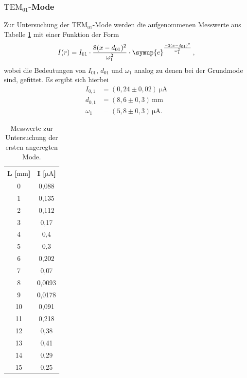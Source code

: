 \subsubsection{$\text{TEM}_{01}$-Mode}
Zur Untersuchung der $\text{TEM}_{01}$-Mode werden die aufgenommenen Messwerte aus Tabelle \ref{mode2} mit einer Funktion der Form
\begin{equation}
  I(r)=I_{01}\cdot\frac{8(x-d_{01})^2}{\omega_1^2}\cdot\symup{e}^{\frac{-2(x-d_{01})^2}{\omega_1^2}} \, ,
\end{equation}
wobei die Bedeutungen von $I_{01}$, $d_{01}$ und $\omega_1$ analog zu denen bei der Grundmode sind, gefittet.
Es ergibt sich hierbei
\begin{align}
  I_{0,1} &=(0,24 \pm 0,02)\, \si{\micro\ampere}\\
  d_{0,1} &=(8,6 \pm 0,3)\, \si{\milli\meter}\\
 \omega_1 &=(5,8 \pm 0,3)\,  \si{\micro\ampere}.
\end{align}
\begin{table}[]
  \centering
\begin{tabular}{c|c}
L [$ \si{\milli\meter}$]   &   I [$ \si{\micro\ampere}$]     \\
  \hline
0  & 0,088  \\
1  & 0,135  \\
2  & 0,112  \\
3  & 0,17   \\
4  & 0,4    \\
5  & 0,3    \\
6  & 0,202  \\
7  & 0,07   \\
8  & 0,0093 \\
9  & 0,0178 \\
10 & 0,091  \\
11 & 0,218  \\
12 & 0,38   \\
13 & 0,41   \\
14 & 0,29   \\
15 & 0,25
\end{tabular}
\caption{Messwerte zur Untersuchung der ersten angeregten Mode.}
\label{mode2}
\end{table}
